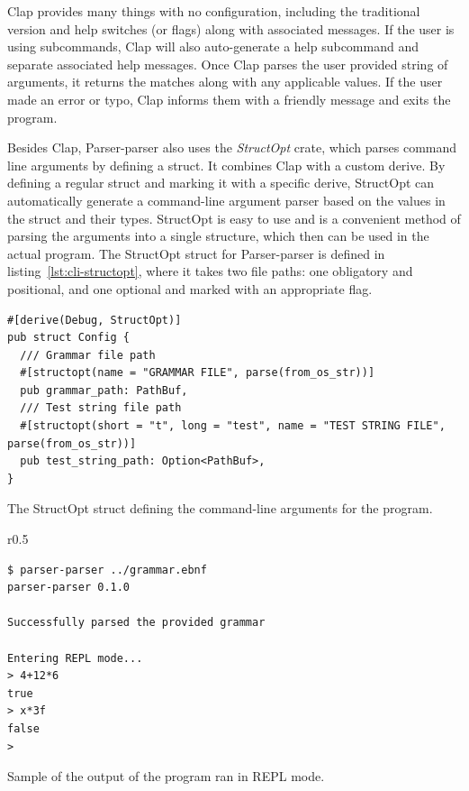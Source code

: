 \documentclass[english,engineering]{wizthesis}
\newcommand{\thisproject}{Parser-parser}
\begin{document}
Clap provides many things with no configuration, including the traditional
version and help switches (or flags) along with associated messages. If the user
is using subcommands, Clap will also auto-generate a help subcommand and
separate associated help messages. Once Clap parses the user provided string of
arguments, it returns the matches along with any applicable values. If the user
made an error or typo, Clap informs them with a friendly message and exits
the program.

Besides Clap, \thisproject{} also uses the \emph{StructOpt} crate, which parses
command line arguments by defining a struct. It combines Clap with a custom
derive. By defining a regular struct and marking it with a specific derive,
StructOpt can automatically generate a command-line argument parser based on the
values in the struct and their types. StructOpt is easy to use and is a
convenient method of parsing the arguments into a single structure, which then
can be used in the actual program. The StructOpt struct for \thisproject{} is
defined in listing~\ref{lst:cli-structopt}, where it takes two file paths: one
obligatory and positional, and one optional and marked with an appropriate flag.

\begin{listing}[H]
  \begin{verbatim}
#[derive(Debug, StructOpt)]
pub struct Config {
  /// Grammar file path
  #[structopt(name = "GRAMMAR FILE", parse(from_os_str))]
  pub grammar_path: PathBuf,
  /// Test string file path
  #[structopt(short = "t", long = "test", name = "TEST STRING FILE", parse(from_os_str))]
  pub test_string_path: Option<PathBuf>,
}
  \end{verbatim}
  \caption{The StructOpt struct defining the command-line arguments for the
  program.}
  \label{lst:cli-structopt}
\end{listing}

\begin{wraplisting}{r}{0.5\textwidth}
  \begin{verbatim}
$ parser-parser ../grammar.ebnf
parser-parser 0.1.0

Successfully parsed the provided grammar

Entering REPL mode...
> 4+12*6
true
> x*3f
false
>
  \end{verbatim}
  \caption{Sample of the output of the program ran in REPL mode.}
  \label{lst:cli-repl}
\end{wraplisting}
\end{document}

